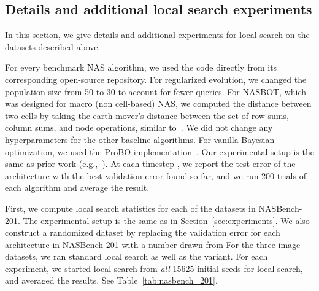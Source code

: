 \documentclass[11pt]{article}
\let\citep\cite
\numberwithin{equation}{section}
\numberwithin{figure}{section}
\theoremstyle{plain}
\theoremstyle{definition}
\begin{document}
\subsection{Details and additional local search experiments}
In this section, we give details and additional experiments for local search 
on the datasets described above.

For every benchmark NAS algorithm, we used the code directly from its corresponding
open-source repository.
For regularized evolution, we changed the population
size from 50 to 30 to account for fewer queries.
For NASBOT, which was designed for macro (non cell-based) NAS, we computed the
distance between two cells by taking the earth-mover's distance between the
set of row sums, column sums, and node operations, similar to~\citep{bananas}.
We did not change any hyperparameters for the other baseline algorithms.
For vanilla Bayesian optimization, we used the ProBO 
implementation~\citep{neiswanger2019probo}.
Our experimental setup is the same as prior work (e.g.,~\citep{nasbench}).
At each timestep , we report the test error of the architecture with the best
validation error found so far, and we run 200 trials of each algorithm and
average the result.


First, we compute local search statistics for each 
of the datasets in NASBench-201.
The experimental setup is the same as in Section~\ref{sec:experiments}.
We also construct a randomized dataset by replacing the validation
error for each architecture in NASBench-201 with a number drawn from  
For the three image datasets, we ran standard local search as well as the
 variant.
For each experiment, we started local search from \emph{all} 15625 initial seeds
for local search, and averaged the results.
See Table~\ref{tab:nasbench_201}.
\end{document}
